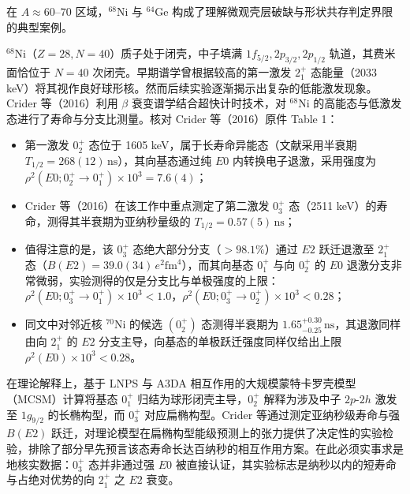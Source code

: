 在 $A\approx 60\text{--}70$ 区域，$^{68}\mathrm{Ni}$ 与 $^{64}\mathrm{Ge}$ 构成了理解微观壳层破缺与形状共存判定界限的典型案例。

$^{68}\mathrm{Ni}$（$Z=28, N=40$）质子处于闭壳，中子填满 $1f_{5/2}, 2p_{3/2}, 2p_{1/2}$ 轨道，其费米面恰位于 $N=40$ 次闭壳。早期谱学曾根据较高的第一激发 $2^+_1$ 态能量（2033 keV）将其视作良好球形核。然而后续实验逐渐揭示出复杂的低能激发现象。Crider 等（2016）\cite{crider-2016-68ni-shape-coexistence}利用 $\beta$ 衰变谱学结合超快计时技术，对 $^{68}\mathrm{Ni}$ 的高能态与低激发态进行了寿命与分支比测量。核对 Crider 等（2016）原件 Table 1：
\begin{itemize}
\item 第一激发 $0^+_2$ 态位于 1605 keV，属于长寿命异能态（文献采用半衰期 $T_{1/2} = 268(12)\,\mathrm{ns}$），其向基态通过纯 $E0$ 内转换电子退激，采用强度为 $\rho^2(E0; 0^+_2 \to 0^+_1) \times 10^3 = 7.6(4)$；
\item Crider 等（2016）在该工作中重点测定了第二激发 $0^+_3$ 态（2511 keV）的寿命，测得其半衰期为亚纳秒量级的 $T_{1/2} = 0.57(5)\,\mathrm{ns}$；
\item 值得注意的是，该 $0^+_3$ 态绝大部分分支（$>98.1\%$）通过 $E2$ 跃迁退激至 $2^+_1$ 态（$B(E2) = 39.0(34)\,e^2\mathrm{fm}^4$），而其向基态 $0^+_1$ 与向 $0^+_2$ 的 $E0$ 退激分支非常微弱，实验测得的仅是分支比与单极强度的上限：$\rho^2(E0; 0^+_3 \to 0^+_1) \times 10^3 < 1.0$，$\rho^2(E0; 0^+_3 \to 0^+_2) \times 10^3 < 0.28$；
\item 同文中对邻近核 $^{70}\mathrm{Ni}$ 的候选 $(0^+_2)$ 态测得半衰期为 $1.65^{+0.30}_{-0.25}\,\mathrm{ns}$，其退激同样由向 $2^+_1$ 的 $E2$ 分支主导，向基态的单极跃迁强度同样仅给出上限 $\rho^2(E0) \times 10^3 < 0.28$。
\end{itemize}
在理论解释上，基于 LNPS 与 A3DA 相互作用的大规模蒙特卡罗壳模型（MCSM）计算将基态 $0^+_1$ 归结为球形闭壳主导，$0^+_2$ 解释为涉及中子 $2p\text{-}2h$ 激发至 $1g_{9/2}$ 的长椭构型，而 $0^+_3$ 对应扁椭构型。Crider 等通过测定亚纳秒级寿命与强 $B(E2)$ 跃迁，对理论模型在扁椭构型能级预测上的张力提供了决定性的实验检验，排除了部分早先预言该态寿命长达百纳秒的相互作用方案。在此必须实事求是地核实数据：$0^+_3$ 态并非通过强 $E0$ 被直接认证，其实验标志是纳秒以内的短寿命与占绝对优势的向 $2^+_1$ 之 $E2$ 衰变。

